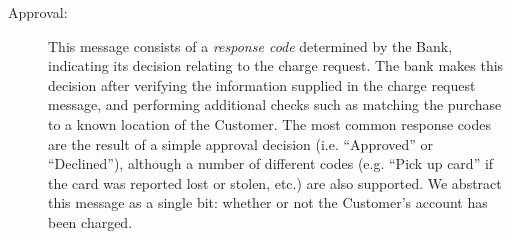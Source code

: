 \begin{description}
\item[Approval:]
This message consists of a \emph{response code} determined by the Bank, indicating its decision relating to the charge request.
The bank makes this decision after verifying the information supplied in the charge request message, and performing additional checks such as matching the purchase to a known location of the Customer.
The most common response codes are the result of a simple approval decision (i.e. ``Approved'' or ``Declined''),
although a number of different codes (e.g. ``Pick up card'' if the card was reported lost or stolen, etc.) are also supported.
We abstract this message as a single bit: whether or not the Customer's account has been charged.

\end{description}
